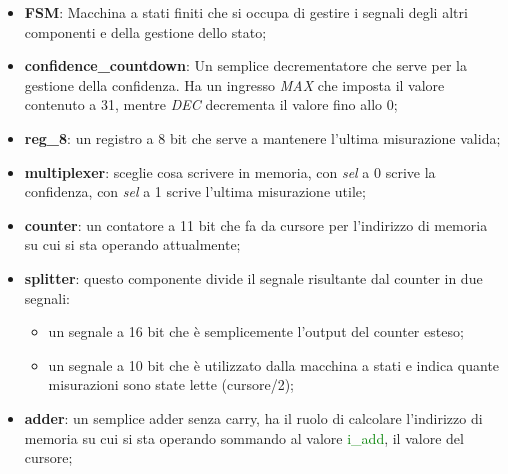 \documentclass[12pt,a4paper]{scrartcl}
\begin{document}
    \begin{itemize}
        \item \textbf{FSM}: Macchina a stati finiti che si occupa di gestire i segnali degli altri componenti e della gestione dello stato;
        \item \textbf{confidence\_countdown}: Un semplice decrementatore che serve per la gestione della confidenza. Ha un ingresso \textit{MAX} che
                imposta il valore contenuto a 31, mentre \textit{DEC} decrementa il valore fino allo 0;
        \item \textbf{reg\_8}: un registro a 8 bit che serve a mantenere l'ultima misurazione valida;
        \item \textbf{multiplexer}: sceglie cosa scrivere in memoria, con \textit{sel} a 0 scrive la confidenza, con \textit{sel} a 1 scrive l'ultima misurazione utile;
        \item \textbf{counter}: un contatore a 11 bit che fa da cursore per l'indirizzo di memoria su cui si sta operando attualmente;
        \item \textbf{splitter}: questo componente divide il segnale risultante dal counter in due segnali:
            \begin{itemize}
                \item un segnale a 16 bit che è semplicemente l'output del counter esteso;
                \item un segnale a 10 bit che è utilizzato dalla macchina a stati e indica quante misurazioni sono state lette (cursore/2); 
            \end{itemize}
        \item \textbf{adder}: un semplice adder senza carry, ha il ruolo di calcolare l'indirizzo di memoria su cui si sta operando sommando al 
                    valore \textcolor{green}{i\_add}, il valore del cursore;
    \end{itemize}
\end{document}
